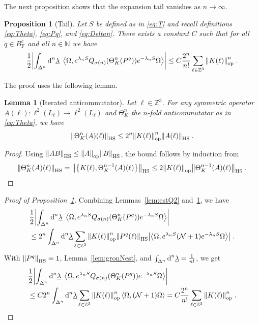 \documentclass[12pt,a4paper]{article}
\numberwithin{equation}{section}
\newcommand{\ulambda}{\underline{\lambda}}
\newcommand{\1}{\mathbb{I}}
\newcommand{\di}{\textnormal{d}}
\newcommand{\F}{\mathrm{F}}
\newcommand{\HS}{\mathrm{HS}}
\newcommand{\Nbb}{\mathbb{N}}
\newcommand{\Zstar}{\mathbb{Z}^3} %
\newcommand{\Z}{\mathbb{Z}}
\newcommand{\NN}{\mathcal{N}}
\newcommand{\half}{\frac{1}{2}}
\newcommand{\eva}[1]{\left\langle #1 \right\rangle}
\theoremstyle{plain}
\newtheorem{lemma}[theorem]{Lemma}
\newtheorem{proposition}[theorem]{Proposition}
\theoremstyle{definition}
\theoremstyle{remark}
\theoremstyle{plain}
\theoremstyle{definition}
\theoremstyle{remark}
\begin{document}
The next proposition shows that the expansion tail vanishes as $ n \to \infty $.
%
\begin{proposition}[Tail]\label{prop:headerr}
Let $S$ be defined as in \eqref{eq:T} and recall definitions \eqref{eq:Theta}, \eqref{eq:Pq}, and \eqref{eq:Deltan}. There exists a constant $C$ such that for all $q \in B^c_{\F}$ and all $n \in \Nbb$ we have
\begin{equation}\label{eq:headest}
	\half \abs{\int_{\Delta^n} \di^n\underline{\lambda} \;
		\eva{\Omega, e^{\lambda_n S}Q_{\sigma(n)}(\Theta^n_{K}(P^q)) e^{-\lambda_n S} \Omega} }
	\leq C \frac{2^n}{n!} \sum_{\ell \in \Zstar} \norm{K(\ell)}^n_{\mathrm{op}} \;.
\end{equation}
\end{proposition}
%
The proof uses the following lemma.
%
\begin{lemma}[Iterated anticommutator]\label{lem:multicommest}
Let $ \ell \in \Zstar $. For any symmetric operator $ A(\ell): \ell^2(L_\ell) \to \ell^2(L_\ell) $ and $\Theta^n_K$ the $ n $-fold anticommutator as in \eqref{eq:Theta}, we have
\begin{equation}
	\norm{\Theta^{n}_K(A)(\ell)}_{\HS}
	\leq 2^n \norm{K(\ell)}^{n}_{\mathrm{op}}\norm{A(\ell)}_{\HS} \;.
\end{equation}
\end{lemma}
%
\begin{proof}
Using $\norm{AB}_{\HS} \leq \norm{A}_{\mathrm{op}} \norm{B}_{\HS}$, the bound follows by induction from
\[
	\norm{\Theta^{n}_K(A)(\ell)}_{\HS}
	= \norm{\left\{K(\ell),\Theta^{n-1}_K(A)(\ell)\right\}}_{\HS}
	\leq 2 \norm{K(\ell)}_{\mathrm{op}}\norm{\Theta^{n-1}_K(A)(\ell)}_{\HS} \;. \qedhere
\]
\end{proof}

\begin{proof}[Proof of Proposition~\ref{prop:headerr}]
Combining Lemmas~\ref{lem:estQ2} and~\ref{lem:multicommest}, we have
\begin{align}
	&\half \abs{\int_{\Delta^n} \di^n \ulambda \;
		\eva{\Omega, e^{\lambda_n S} Q_{\sigma(n)}(\Theta^n_{K}(P^q)) e^{-\lambda_n S} \Omega} } \nonumber\\
	&\leq 2^n \int_{\Delta^n} \di^n \ulambda \sum_{\ell \in \Zstar} \norm{K(\ell)}^n_{\mathrm{op}} \norm{P^q(\ell)}_{\HS} 
		\abs{\eva{\Omega, e^{\lambda_n S} (\NN +1) e^{-\lambda_n S} \Omega}} \;.
\end{align}
With $ \norm{P^q}_{\HS} = 1$, Lemma~\ref{lem:gronNest}, and $ \int_{\Delta^n} \di^n\underline{\lambda} = \frac{1}{n!} $, we get
\begin{align*}
	&\half \abs{\int_{\Delta^n} \di^n \ulambda \;
		\eva{\Omega, e^{\lambda_n S} Q_{\sigma(n)}(\Theta^n_{K}(P^q)) e^{-\lambda_n S} \Omega} }
	\\
	& \leq C 2^n \int_{\Delta^n} \di^n \ulambda \sum_{\ell \in \Zstar} \norm{K(\ell)}^n_{\mathrm{op}} \eva{\Omega,(\NN+1)\Omega} =  C \frac{2^n}{n!} \sum_{\ell \in \Zstar} \norm{K(\ell)}^n_{\mathrm{op}} \;. \qedhere
\end{align*}
\end{proof}
\end{document}
